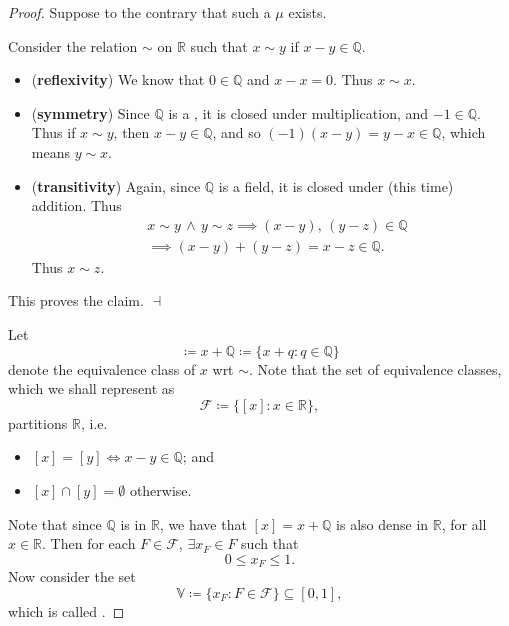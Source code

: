 \documentclass[notoc,notitlepage]{tufte-book}
\begin{document}
\begin{proof}
  Suppose to the contrary that such a $\mu$ exists.

  \noindent
   Consider the relation $\sim$ on $\mathbb{R}$ such that $x
  \sim y$ if $x - y \in \mathbb{Q}$.

  \noindent
  \begin{itemize}
    \item (\textbf{reflexivity}) We know that $0 \in \mathbb{Q}$ and $x - x = 0$.
      Thus $x \sim x$.
    \item (\textbf{symmetry}) Since $\mathbb{Q}$ is a , it is
      closed under multiplication, and $-1 \in \mathbb{Q}$. Thus if $x \sim y$,
      then $x - y \in \mathbb{Q}$, and so $(-1)(x - y) = y - x \in \mathbb{Q}$,
      which means $y \sim x$.
    \item (\textbf{transitivity}) Again, since $\mathbb{Q}$ is a field, it is
      closed under (this time) addition. Thus
      \begin{align*}
        &x \sim y \, \land \, y \sim z \implies (x - y), \, (y - z) \in
        \mathbb{Q} \\
        &\implies (x - y) + (y - z) = x - z \in \mathbb{Q}.
      \end{align*}
      Thus $x \sim z$.
  \end{itemize}
  This proves the claim. $\dashv$

  Let
  \begin{equation*}
    [x] \coloneqq x + \mathbb{Q} \coloneqq \{ x + q : q \in \mathbb{Q} \}
  \end{equation*}
  denote the equivalence class of $x$ wrt $\sim$. Note that the set of
  equivalence classes, which we shall represent as
  \begin{equation*}
    \mathcal{F} \coloneqq \{ [x] : x \in \mathbb{R} \},
  \end{equation*}
  partitions $\mathbb{R}$, i.e.
  \begin{itemize}
    \item $[x] = [y] \iff x - y \in \mathbb{Q}$; and
    \item $[x] \cap [y] = \emptyset$ otherwise.
  \end{itemize}

  Note that since $\mathbb{Q}$ is  in $\mathbb{R}$, we have that
  $[x] = x + \mathbb{Q}$ is also dense in $\mathbb{R}$, for all $x \in
  \mathbb{R}$. Then for each  $F \in \mathcal{F}$, $\exists
  x_F \in F$ such that
  \begin{equation*}
    0 \leq x_F \leq 1.
  \end{equation*}
  Now consider the set
  \begin{equation*}
    \mathbb{V} \coloneqq \{ x_F : F \in \mathcal{F} \} \subseteq [0, 1],
  \end{equation*}
  which is called .


\end{proof}
\end{document}
